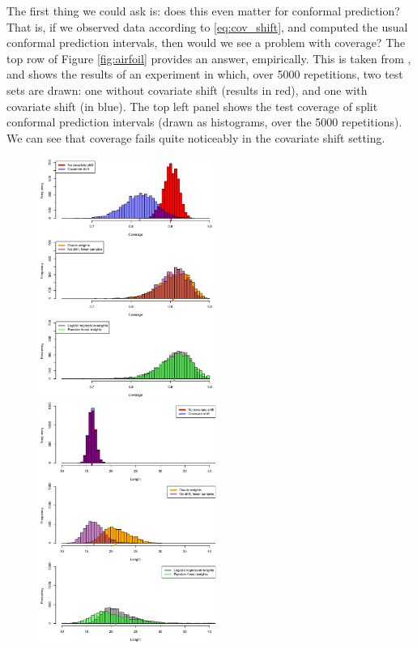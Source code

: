 \documentclass{article}
\begin{document}
The first thing we could ask is: does this even matter for conformal prediction?
That is, if we observed data according to \eqref{eq:cov_shift}, and computed the 
usual conformal prediction intervals, then would we see a problem with coverage?
The top row of Figure \ref{fig:airfoil} provides an answer, empirically. This is 
taken from \citet{tibshirani2019conformal}, and shows the results of an
experiment in which, over 5000 repetitions, two test sets are drawn: one without  
covariate shift (results in red), and one with covariate shift (in blue). The
top left panel shows the test coverage of split conformal prediction intervals 
(drawn as histograms, over the 5000 repetitions). We can see that coverage fails
quite noticeably in the covariate shift setting.

\begin{figure}[htb]
\hspace{-25pt}
\includegraphics[width=0.525\textwidth]{airfoil_cov.pdf}
\includegraphics[width=0.525\textwidth]{airfoil_len.pdf}

\end{figure}
\end{document}
